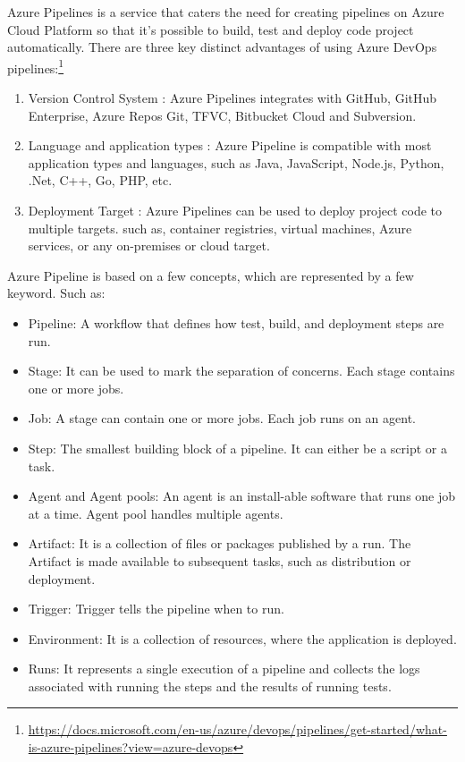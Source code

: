 \documentclass{article}
\begin{document}
Azure Pipelines is a service that caters the need for creating pipelines on Azure Cloud Platform so that it's possible to build, test and deploy code project automatically. There are three key distinct advantages of using Azure DevOps pipelines:\footnote{\url{https://docs.microsoft.com/en-us/azure/devops/pipelines/get-started/what-is-azure-pipelines?view=azure-devops}}

 \begin{enumerate}
     \item Version Control System : Azure Pipelines integrates with GitHub, GitHub Enterprise, Azure Repos Git, TFVC, Bitbucket Cloud and Subversion.
     \item Language and application types : Azure Pipeline is compatible with most application types and languages, such as Java, JavaScript, Node.js, Python, .Net, C++, Go, PHP, etc.
     \item Deployment Target :  Azure Pipelines can be used to deploy project code to multiple targets. such as, container registries, virtual machines, Azure services, or any on-premises or cloud target.
 \end{enumerate}
 
 Azure Pipeline is based on a few concepts, which are represented by a few keyword. Such as:
 
 \begin{itemize}
     \item Pipeline: A workflow that defines how test, build, and deployment steps are run.
     \item Stage: It can be used to mark the separation of concerns. Each stage contains one or more jobs.
     \item Job: A stage can contain one or more jobs. Each job runs on an agent.
     \item Step: The smallest building block of a pipeline. It can either be a script or a task.
     \item Agent and Agent pools: An agent is an install-able software that runs one job at a time. Agent pool handles multiple agents.
     \item Artifact: It is a collection of files or packages published by a run. The Artifact is made available to subsequent tasks, such as distribution or deployment.
     \item Trigger: Trigger tells the pipeline when to run.
     \item Environment: It is a collection of resources, where the application is deployed.
     \item Runs: It represents a single execution of a pipeline and collects the logs associated with running the steps and the results of running tests.
 \end{itemize}
\end{document}
